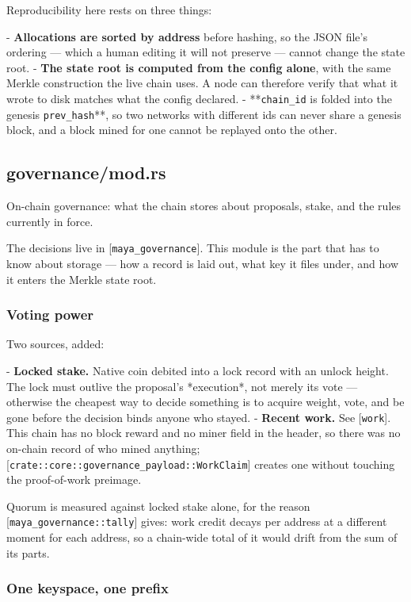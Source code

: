\documentclass[11pt,a4paper]{article}
\begin{document}
Reproducibility here rests on three things:

- \textbf{Allocations are sorted by address} before hashing, so the JSON file's
  ordering — which a human editing it will not preserve — cannot change the
  state root.
- \textbf{The state root is computed from the config alone}, with the same Merkle
  construction the live chain uses. A node can therefore verify that what it
  wrote to disk matches what the config declared.
- **\texttt{chain\_id} is folded into the genesis \texttt{prev\_hash}**, so two networks with
  different ids can never share a genesis block, and a block mined for one
  cannot be replayed onto the other.

\subsection{governance/mod.rs}
On-chain governance: what the chain stores about proposals, stake, and the
rules currently in force.

The decisions live in [\texttt{maya\_governance}]. This module is the part that has
to know about storage — how a record is laid out, what key it files under,
and how it enters the Merkle state root.

\subsubsection{Voting power}

Two sources, added:

- \textbf{Locked stake.} Native coin debited into a lock record with an unlock
  height. The lock must outlive the proposal's *execution*, not merely its
  vote — otherwise the cheapest way to decide something is to acquire
  weight, vote, and be gone before the decision binds anyone who stayed.
- \textbf{Recent work.} See [\texttt{work}]. This chain has no block reward and no miner
  field in the header, so there was no on-chain record of who mined
  anything; [\texttt{crate::core::governance\_payload::WorkClaim}] creates one
  without touching the proof-of-work preimage.

Quorum is measured against locked stake alone, for the reason
[\texttt{maya\_governance::tally}] gives: work credit decays per address at a
different moment for each address, so a chain-wide total of it would drift
from the sum of its parts.

\subsubsection{One keyspace, one prefix}
\end{document}
